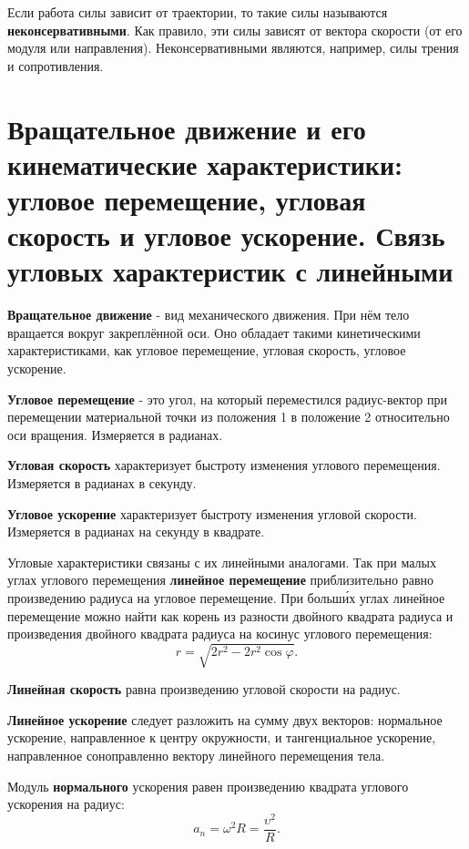 \documentclass[10pt]{scrbook}
\begin{document}
Если работа силы зависит от траектории, то такие силы называются
\textbf{неконсервативными}. Как правило, эти силы зависят от вектора скорости
(от его модуля или направления). Неконсервативными являются, например, силы
трения и сопротивления.


\section[шестой вопрос]{Вращательное движение и его кинематические
  характеристики: угловое перемещение, угловая скорость и угловое ускорение.
  Связь угловых характеристик с линейными}

\textbf{Вращательное движение} - вид механического движения. При нём тело
вращается вокруг закреплённой оси. Оно обладает такими кинетическими
характеристиками, как угловое перемещение, угловая скорость, угловое ускорение.

\textbf{Угловое перемещение} - это угол, на который переместился радиус-вектор
при перемещении материальной точки из положения 1 в положение 2 относительно
оси вращения. Измеряется в радианах.

\textbf{Угловая скорость} характеризует быстроту изменения углового перемещения.
Измеряется в радианах в секунду.

\textbf{Угловое ускорение} характеризует быстроту изменения угловой скорости. Измеряется
в радианах на секунду в квадрате.

Угловые характеристики связаны с их линейными аналогами. Так при малых углах
углового перемещения \textbf{линейное перемещение} приблизительно равно произведению
радиуса на угловое перемещение. При больши́х углах линейное перемещение можно
найти как корень из разности двойного квадрата радиуса и произведения двойного
квадрата радиуса на косинус углового перемещения: \[
	r = \sqrt{2r^2 - 2r^2 \cos{\varphi}}
	.\]

\textbf{Линейная скорость} равна произведению угловой скорости на радиус.

\textbf{Линейное ускорение} следует разложить на сумму двух векторов: нормальное
ускорение, направленное к центру окружности, и тангенциальное ускорение,
направленное соноправленно вектору линейного перемещения тела.

Модуль \textbf{нормального} ускорения равен произведению квадрата углового
ускорения на радиус: \[
	a_n = \omega^2 R = \frac{\upsilon^2}{R}
	.\]
\end{document}
